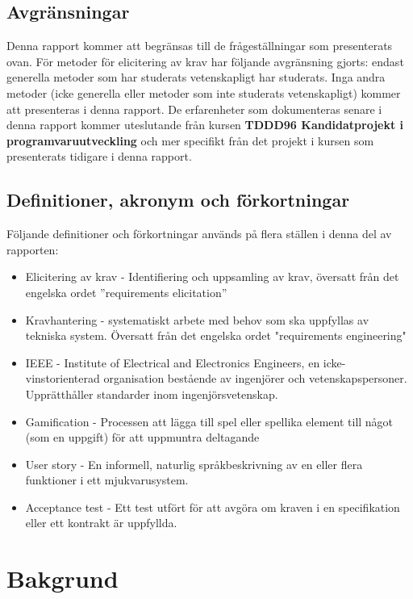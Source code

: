 \subsection{Avgränsningar}
\label{sec:limits-jannering}
Denna rapport kommer att begränsas till de frågeställningar som presenterats ovan. För metoder för elicitering av krav har följande avgränsning gjorts: endast generella metoder som har studerats vetenskapligt har studerats. Inga andra metoder (icke generella eller metoder som inte studerats vetenskapligt) kommer att presenteras i denna rapport. De erfarenheter som dokumenteras senare i denna rapport kommer uteslutande från kursen \textbf{TDDD96 	Kandidatprojekt i programvaruutveckling} och mer specifikt från det projekt i kursen som presenterats tidigare i denna rapport.   
\subsection{Definitioner, akronym och förkortningar}
Följande definitioner och förkortningar används på flera ställen i denna del av rapporten:
\begin{itemize}
	\item Elicitering av krav - Identifiering och uppsamling av krav, översatt från det engelska ordet ”requirements elicitation”
	\item Kravhantering - systematiskt arbete med behov som ska uppfyllas av tekniska system. Översatt från det engelska ordet "requirements engineering"
	\item IEEE - Institute of Electrical and Electronics Engineers, en icke-vinstorienterad organisation bestående av ingenjörer och vetenskapspersoner. Upprätthåller standarder inom ingenjörsvetenskap.
	\item Gamification - Processen att lägga till spel eller spellika element till något (som en uppgift) för att uppmuntra deltagande
	\item User story - En informell, naturlig språkbeskrivning av en eller flera funktioner i ett mjukvarusystem.
	\item Acceptance test - Ett test utfört för att avgöra om kraven i en specifikation eller ett kontrakt är uppfyllda.
\end{itemize}
\section{Bakgrund}
\label{sec:background-jannering}

